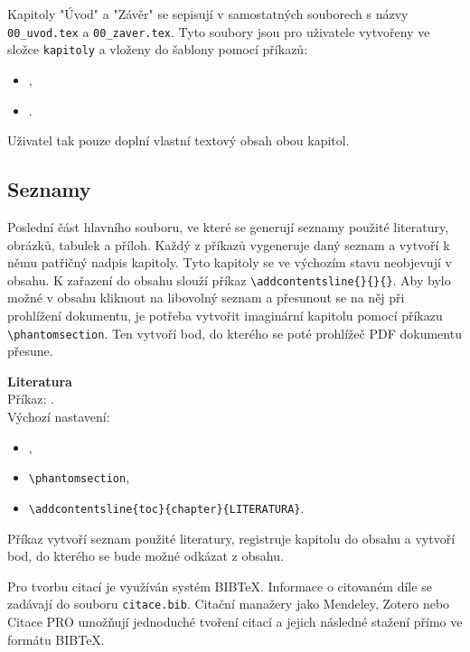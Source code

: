 Kapitoly "Úvod" a "Závěr" se sepisují v samostatných souborech s názvy \verb|00_uvod.tex| a \verb|00_zaver.tex|. Tyto soubory jsou pro uživatele vytvořeny ve složce \verb|kapitoly| a vloženy do šablony pomocí příkazů:

\begin{itemize}[label={-}]
	\item \verb||,
	\item \verb||.
\end{itemize}

Uživatel tak pouze doplní vlastní textový obsah obou kapitol.





\subsection{Seznamy}
Poslední část hlavního souboru, ve které se generují seznamy použité literatury, obrázků, tabulek a příloh. Každý z příkazů vygeneruje daný seznam a vytvoří k němu patřičný nadpis kapitoly. Tyto kapitoly se ve výchozím stavu neobjevují v obsahu. K zařazení do obsahu slouží příkaz \verb|\addcontentsline{}{}{}|. Aby bylo možné v obsahu kliknout na libovolný seznam a přesunout se na něj při prohlížení dokumentu, je potřeba vytvořit imaginární kapitolu pomocí příkazu \verb|\phantomsection|. Ten vytvoří bod, do kterého se poté prohlížeč PDF dokumentu přesune.

\vspace{8pt}

\textbf{Literatura}\\
Příkaz: \verb||.\\
Výchozí nastavení:

\begin{itemize}[label={-}]
	\item \verb||,
	\item \verb|\phantomsection|,
	\item \verb|\addcontentsline{toc}{chapter}{LITERATURA}|.
\end{itemize}

Příkaz vytvoří seznam použité literatury, registruje kapitolu do obsahu a vytvoří bod, do kterého se bude možné odkázat z obsahu.

Pro tvorbu citací je využíván systém BIB\TeX. Informace o citovaném díle se zadávají do souboru \verb|citace.bib|. Citační manažery jako Mendeley, Zotero nebo Citace PRO umožňují jednoduché tvoření citací a jejich následné stažení přímo ve formátu BIB\TeX. 

